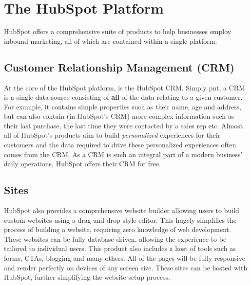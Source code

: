 \section{The HubSpot Platform}
HubSpot offers a comprehensive suite of products to help businesses employ inbound marketing, all of which are contained within a single platform.

\subsection{Customer Relationship Management (CRM)}
At the core of the HubSpot platform, is the HubSpot CRM. Simply put, a CRM is a single data source consisting of \textbf{all} of the data relating to a given customer. For example, it contains simple properties such as their name, age and address, but can also contain (in HubSpot's CRM) more complex information such as their last purchase, the last time they were contacted by a sales rep etc. Almost all of HubSpot's products aim to build \textit{personalized} experiences for their customers and the data required to drive these personalized experiences often comes from the CRM. As a CRM is such an integral part of a modern business' daily operations, HubSpot offers their CRM for free. 

\subsection{Sites}
HubSpot also provides a comprehensive website builder allowing users to build custom websites using a drag-and-drop style editor. This hugely simplifies the process of building a website, requiring zero knowledge of web development. These websites can be fully database driven, allowing the experience to be tailored to individual users. This product also includes a host of tools such as forms, CTAs, blogging and many others. All of the pages will be fully responsive and render perfectly on devices of any screen size. These sites can be hosted with HubSpot, further simplifying the website setup process.

